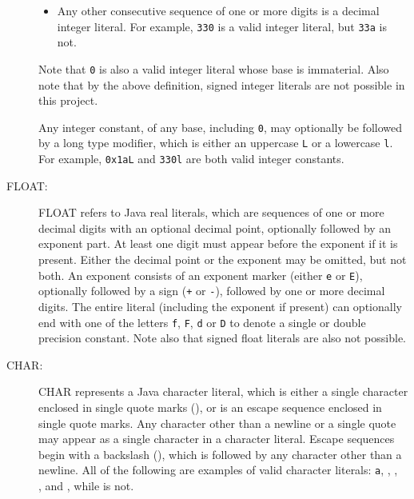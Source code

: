 \documentclass[11pt]{article}
\newcommand{\squoted}[1]{\texttt{\textquotesingle#1\textquotesingle}}
\begin{document}
\begin{description}
\begin{itemize}
                  \item Any other consecutive sequence of one or more digits
                        is a decimal integer literal.  For example,
                        \texttt{330} is a valid integer literal, but
                        \texttt{33a} is not.

                \end{itemize}

                \vspace{-2.5mm}

                Note that \texttt{0} is also a valid integer literal whose
                base is immaterial.  Also note that by the above definition,
                signed integer literals are not possible in this project.

                Any integer constant, of any base, including \texttt{0}, may
                optionally be followed by a long type modifier, which is
                either an uppercase \texttt{L} or a lowercase \texttt{l}.
                For example, \texttt{0x1aL} and \texttt{330l} are both valid
                integer constants.

          \item[FLOAT:] FLOAT refers to Java real literals, which are
                sequences of one or more decimal digits with an optional
                decimal point, optionally followed by an exponent part.  At
                least one digit must appear before the exponent if it is
                present.  Either the decimal point or the exponent may be
                omitted, but not both.  An exponent consists of an exponent
                marker (either \texttt{e} or \texttt{E}), optionally
                followed by a sign (\texttt{+} or \texttt{-}), followed by
                one or more decimal digits.  The entire literal (including
                the exponent if present) can optionally end with one of the
                letters \texttt{f}, \texttt{F}, \texttt{d} or \texttt{D} to
                denote a single or double precision constant.  Note also
                that signed float literals are also not possible.

          \item[CHAR:] CHAR represents a Java character literal, which is
                either a single character enclosed in single quote marks
                (\textquotesingle\textquotesingle), or is an escape sequence
                enclosed in single quote marks.  Any character other than a
                newline or a single quote may appear as a single character
                in a character literal.  Escape sequences begin with a
                backslash (\verb@\@), which is followed by any
                character other than a newline.  All of the following are
                examples of valid character literals: \squoted{a},
                \squoted{\string\a}, \squoted{\string\n},
                \squoted{\string\\}, and
                \texttt{\textquotesingle}\verb@\@\texttt{\textquotesingle}%
                \texttt{\textquotesingle}, while \squoted{\textquotesingle}
                is not.


\end{description}
\end{document}
